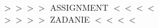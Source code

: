 \newpage
\thispagestyle{empty}
\vspace*{9cm}
\begin{center}
{\color{red}\LARGE{$>>>>$ ASSIGNMENT $<<<<$\\$>>>>$ ZADANIE $<<<<$}}
\end{center}